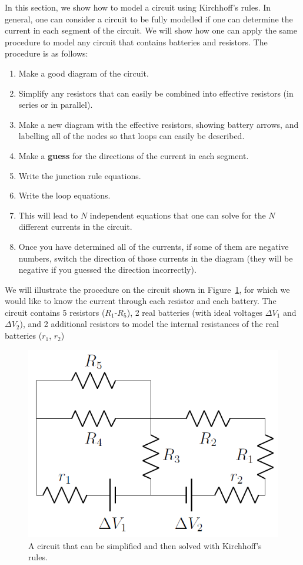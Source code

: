 In this section, we show how to model a circuit using Kirchhoff's rules. In general, one can consider a circuit to be fully modelled if one can determine the current in each segment of the circuit. We will show how one can apply the same procedure to model any circuit that contains batteries and resistors. The procedure is as follows:

\begin{enumerate}
\item Make a good diagram of the circuit.
\item Simplify any resistors that can easily be combined into effective resistors (in series or in parallel).
\item Make a new diagram with the effective resistors, showing battery arrows, and labelling all of the nodes so that loops can easily be described.
\item Make a \textbf{guess} for the directions of the current in each segment.
\item Write the junction rule equations.
\item Write the loop equations.
\item This will lead to $N$ independent equations that one can solve for the $N$ different currents in the circuit.
\item Once you have determined all of the currents, if some of them are negative numbers, switch the direction of those currents in the diagram (they will be negative if you guessed the direction incorrectly).
\end{enumerate}

We will illustrate the procedure on the circuit shown in Figure~\ref{fig:circuits:bigcircuit}, for which we would like to know the current through each resistor and each battery. The circuit contains 5 resistors ($R_1$-$R_5$), 2 real batteries (with ideal voltages $\Delta V_1$ and $\Delta V_2$), and 2 additional resistors to model the internal resistances of the real batteries ($r_1$, $r_2$)

\begin{figure}[!htbp]
\centering
\includegraphics[width=0.42\linewidth]{files/bigcircuit-d85731ab6ffaa6e5a59fc67d56856ba0.png}
\caption[]{A circuit that can be simplified and then solved with Kirchhoff's rules.}
\label{fig:circuits:bigcircuit}
\end{figure}

